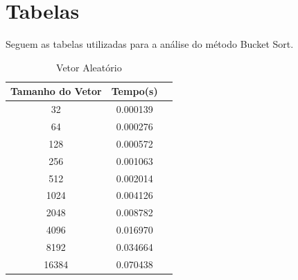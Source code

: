 \documentclass[12pt,a4paper,twoside]{report}
\begin{document}
\begin{enumerate}
\begin{enumerate}
										\end{enumerate}


\end{enumerate}

\chapter{Tabelas}

Seguem as tabelas utilizadas para a análise do método Bucket Sort.

\begin{table}[h]
  \centering
  \caption{Vetor Aleatório \label{tab:aleatorio}}
  \begin{tabular}{ccc} \\\hline
  \textbf{Tamanho do Vetor}  & \textbf{Tempo(s)} \\\hline
  32                                   & 0.000139          \\\hline
  64                                   & 0.000276          \\\hline
  128                                  & 0.000572          \\\hline
  256                                  & 0.001063          \\\hline
  512                                  & 0.002014          \\\hline
  1024                                 & 0.004126          \\\hline
  2048                                 & 0.008782          \\\hline
  4096                                 & 0.016970         \\\hline
  8192                                 & 0.034664         \\\hline
  16384                                & 0.070438        \\\hline
  \end{tabular}
\end{table}
\end{document}
